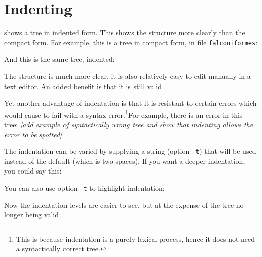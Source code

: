 
\section{Indenting}
\label{sct_indent}

\nwindent{} shows a \nw{} tree in indented form. This shows the structure more
clearly than the compact form. For example, this is a tree in compact form, in
file \texttt{falconiformes}:

And this is the same tree, indented:


The structure is much more clear, it is also relatively easy to edit manually
in a text editor. An added benefit is that it is still valid \nw. 

Yet another advantage of indentation is that it is resistant to certain errors which would cause \display{} to fail with a syntax error.\footnote{This is because indentation is a purely lexical process, hence it does not need a syntactically correct tree.}For example, there is an error in this tree:
\emph{[add example of syntactically wrong tree and show that indenting allows the error to be spotted]}

The indentation can be varied by supplying a string (option \texttt{-t}) that
will be used instead of the default (which is two spaces). If you want a deeper
indentation, you could say this:


You can also use option \texttt{-t} to highlight indentation:


Now the indentation levels are easier to see, but at the expense of the tree no
longer being valid \nw.





